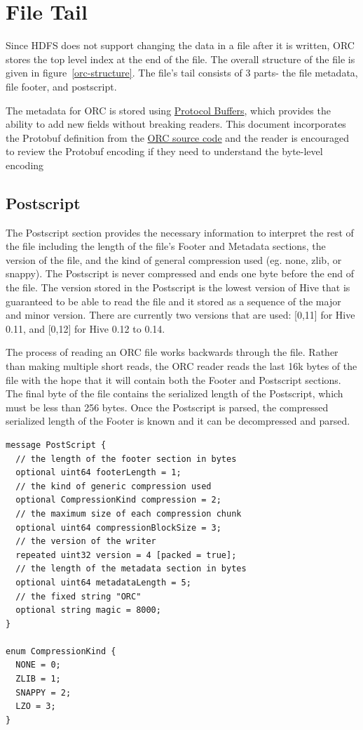 \documentclass{article}
\begin{document}
\section{File Tail}

Since HDFS does not support changing the data in a file after it is
written, ORC stores the top level index at the end of the file. The
overall structure of the file is given in figure~\ref{orc-structure}.
The file's tail consists of 3 parts- the file metadata, file footer,
and postscript.

The metadata for ORC is stored using
\href{http://s.apache.org/protobuf_encoding}{Protocol Buffers}, which
provides the ability to add new fields without breaking readers. This
document incorporates the Protobuf definition from the
\href{http://s.apache.org/orc_proto}{ORC source code} and the reader
is encouraged to review the Protobuf encoding if they need to understand
the byte-level encoding

\subsection{Postscript}

The Postscript section provides the necessary information to interpret
the rest of the file including the length of the file's Footer and
Metadata sections, the version of the file, and the kind of general
compression used (eg. none, zlib, or snappy). The Postscript is never
compressed and ends one byte before the end of the file.  The version
stored in the Postscript is the lowest version of Hive that is
guaranteed to be able to read the file and it stored as a sequence of
the major and minor version. There are currently two versions that are
used: [0,11] for Hive 0.11, and [0,12] for Hive 0.12 to 0.14.

The process of reading an ORC file works backwards through the
file. Rather than making multiple short reads, the ORC reader reads
the last 16k bytes of the file with the hope that it will contain both
the Footer and Postscript sections. The final byte of the file
contains the serialized length of the Postscript, which must be less
than 256 bytes. Once the Postscript is parsed, the compressed
serialized length of the Footer is known and it can be decompressed
and parsed.

\begin{verbatim}
message PostScript {
  // the length of the footer section in bytes
  optional uint64 footerLength = 1;
  // the kind of generic compression used
  optional CompressionKind compression = 2;
  // the maximum size of each compression chunk
  optional uint64 compressionBlockSize = 3;
  // the version of the writer
  repeated uint32 version = 4 [packed = true];
  // the length of the metadata section in bytes
  optional uint64 metadataLength = 5;
  // the fixed string "ORC"
  optional string magic = 8000;
}

enum CompressionKind {
  NONE = 0;
  ZLIB = 1;
  SNAPPY = 2;
  LZO = 3;
}
\end{verbatim}
\end{document}
